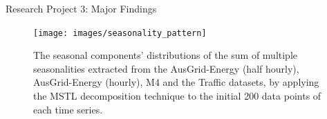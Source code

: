 \documentclass{beamer}
\begin{document}
\begin{frame}{Research Project 3: Major Findings}
  	\begin{figure}[htbp]
\centerline{\texttt{[image: images/seasonality\_pattern]}}
\caption{\tiny The seasonal components' distributions of the sum of multiple seasonalities extracted from the AusGrid-Energy (half hourly), AusGrid-Energy (hourly), M4 and the Traffic datasets, by applying the MSTL decomposition technique to the initial 200 data points of each time series.}
\label{seasonalpatterns}
\end{figure}
\end{frame}
%

\end{document}
